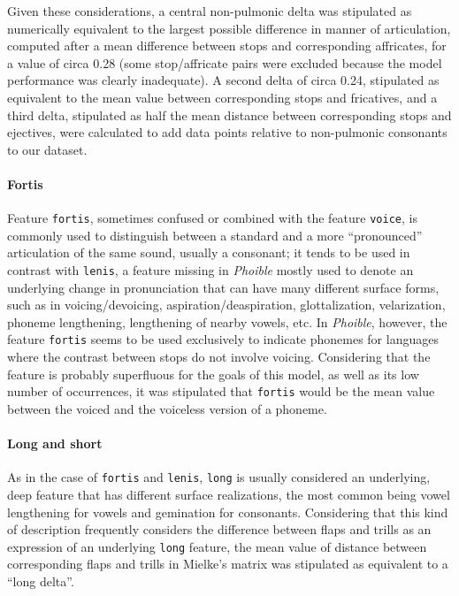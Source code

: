\documentclass[a4paper]{article}
\begin{document}
Given these considerations, a central non-pulmonic delta was stipulated
as numerically equivalent to the largest possible difference in manner
of articulation, computed after a mean difference between stops and
corresponding affricates, for a value of circa 0.28 (some stop/affricate
pairs were excluded because the model performance was clearly
inadequate). A second delta of circa 0.24, stipulated as equivalent to
the mean value between corresponding stops and fricatives, and a third
delta, stipulated as half the mean distance between corresponding stops
and ejectives, were calculated to add data points relative to
non-pulmonic consonants to our dataset.

\paragraph{Fortis}\label{fortis}

Feature \texttt{fortis}, sometimes confused or combined with the feature
\texttt{voice}, is commonly used to distinguish between a standard and a
more ``pronounced'' articulation of the same sound, usually a consonant;
it tends to be used in contrast with \texttt{lenis}, a feature missing
in \emph{Phoible} mostly used to denote an underlying change in
pronunciation that can have many different surface forms, such as in
voicing/devoicing, aspiration/deaspiration, glottalization,
velarization, phoneme lengthening, lengthening of nearby vowels, etc. In
\emph{Phoible}, however, the feature \texttt{fortis} seems to be used
exclusively to indicate phonemes for languages where the contrast
between stops do not involve voicing. Considering that the feature is
probably superfluous for the goals of this model, as well as its low
number of occurrences, it was stipulated that \texttt{fortis} would be
the mean value between the voiced and the voiceless version of a
phoneme.

\paragraph{Long and short}\label{long-and-short}

As in the case of \texttt{fortis} and \texttt{lenis}, \texttt{long} is
usually considered an underlying, deep feature that has different
surface realizations, the most common being vowel lengthening for vowels
and gemination for consonants. Considering that this kind of description
frequently considers the difference between flaps and trills as an
expression of an underlying \texttt{long} feature, the mean value of
distance between corresponding flaps and trills in Mielke's matrix was
stipulated as equivalent to a ``long delta''.
\end{document}
